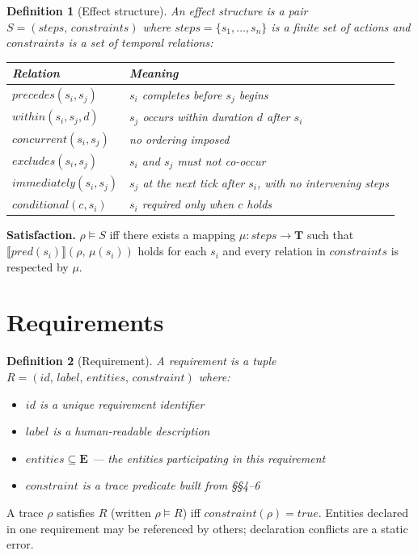 \documentclass{article}
\newtheorem{definition}{Definition}
\begin{document}
\begin{definition}[Effect structure]
    An effect structure is a pair $S = (\mathit{steps},\, \mathit{constraints})$ where $\mathit{steps} = \{s_1, \ldots, s_n\}$ is a finite set of actions and $\mathit{constraints}$ is a set of temporal relations:

    \begin{tabularx}{\textwidth}{lX}
        \toprule
        \textbf{Relation}                & \textbf{Meaning}                                              \\
        \midrule
        $\mathit{precedes}(s_i, s_j)$    & $s_i$ completes before $s_j$ begins                           \\
        $\mathit{within}(s_i, s_j, d)$   & $s_j$ occurs within duration $d$ after $s_i$                  \\
        $\mathit{concurrent}(s_i, s_j)$  & no ordering imposed                                           \\
        $\mathit{excludes}(s_i, s_j)$    & $s_i$ and $s_j$ must not co-occur                             \\
        $\mathit{immediately}(s_i, s_j)$ & $s_j$ at the next tick after $s_i$, with no intervening steps \\
        $\mathit{conditional}(c, s_i)$   & $s_i$ required only when $c$ holds                            \\
        \bottomrule
    \end{tabularx}
\end{definition}

\textbf{Satisfaction.} $\rho \models S$ iff there exists a mapping $\mu : \mathit{steps} \to \mathbf{T}$ such that $\llbracket\mathit{pred}(s_i)\rrbracket(\rho,\, \mu(s_i))$ holds for each $s_i$ and every relation in $\mathit{constraints}$ is respected by $\mu$.

\section{Requirements}

\begin{definition}[Requirement]
    A requirement is a tuple $R = (\mathit{id},\, \mathit{label},\, \mathit{entities},\, \mathit{constraint})$ where:
    \begin{itemize}
        \item $\mathit{id}$ is a unique requirement identifier
        \item $\mathit{label}$ is a human-readable description
        \item $\mathit{entities} \subseteq \mathbf{E}$ — the entities participating in this requirement
        \item $\mathit{constraint}$ is a trace predicate built from §§4--6
    \end{itemize}
\end{definition}

A trace $\rho$ satisfies $R$ (written $\rho \models R$) iff $\mathit{constraint}(\rho) = \mathit{true}$. Entities declared in one requirement may be referenced by others; declaration conflicts are a static error.
\end{document}
